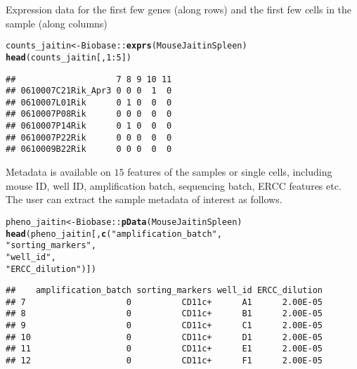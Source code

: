\documentclass[12pt]{article}\usepackage[]{graphicx}\usepackage[usenames,dvipsnames]{color}
\makeatletter
\newcommand{\hlnum}[1]{\textcolor[rgb]{0.686,0.059,0.569}{#1}}%
\newcommand{\hlstr}[1]{\textcolor[rgb]{0.192,0.494,0.8}{#1}}%
\newcommand{\hlopt}[1]{\textcolor[rgb]{0,0,0}{#1}}%
\newcommand{\hlstd}[1]{\textcolor[rgb]{0.345,0.345,0.345}{#1}}%
\newcommand{\hlkwb}[1]{\textcolor[rgb]{0.69,0.353,0.396}{#1}}%
\newcommand{\hlkwd}[1]{\textcolor[rgb]{0.737,0.353,0.396}{\textbf{#1}}}%
\newenvironment{kframe}{%
 \def\at@end@of@kframe{}%
 \ifinner\ifhmode%
  \def\at@end@of@kframe{\end{minipage}}%
  \begin{minipage}{\columnwidth}%
 \fi\fi%
 \def\FrameCommand##1{\hskip\@totalleftmargin \hskip-\fboxsep
 \colorbox{shadecolor}{##1}\hskip-\fboxsep
     \hskip-\linewidth \hskip-\@totalleftmargin \hskip\columnwidth}%
 \MakeFramed {\advance\hsize-\width
   \@totalleftmargin\z@ \linewidth\hsize
   \@setminipage}}%
 {\par\unskip\endMakeFramed%
 \at@end@of@kframe}
\newenvironment{knitrout}{}{} %
\makeatother
\begin{document}
Expression data for the first few genes (along rows) and the first few
cells in the sample (along columns)

\begin{knitrout}
\color{fgcolor}\begin{kframe}
\begin{alltt}
\hlstd{counts_jaitin} \hlkwb{<-} \hlstd{Biobase}\hlopt{::}\hlkwd{exprs}\hlstd{(MouseJaitinSpleen)}
\hlkwd{head}\hlstd{(counts_jaitin[,}\hlnum{1}\hlopt{:}\hlnum{5}\hlstd{])}
\end{alltt}
\begin{verbatim}
##                    7 8 9 10 11
## 0610007C21Rik_Apr3 0 0 0  1  0
## 0610007L01Rik      0 1 0  0  0
## 0610007P08Rik      0 0 0  0  0
## 0610007P14Rik      0 1 0  0  0
## 0610007P22Rik      0 0 0  0  0
## 0610009B22Rik      0 0 0  0  0
\end{verbatim}
\end{kframe}
\end{knitrout}


Metadata is available on $15$ features of the samples or single cells,
including mouse ID, well ID, amplification batch, sequencing batch,
ERCC features etc. The user can extract the sample metadata of interest as
follows.

\begin{knitrout}
\color{fgcolor}\begin{kframe}
\begin{alltt}
\hlstd{pheno_jaitin} \hlkwb{<-} \hlstd{Biobase}\hlopt{::}\hlkwd{pData}\hlstd{(MouseJaitinSpleen)}
\hlkwd{head}\hlstd{(pheno_jaitin[ ,}\hlkwd{c}\hlstd{(}\hlstr{"amplification_batch"}\hlstd{,}
                      \hlstr{"sorting_markers"}\hlstd{,}
                      \hlstr{"well_id"}\hlstd{,}
                      \hlstr{"ERCC_dilution"}\hlstd{)])}
\end{alltt}
\begin{verbatim}
##    amplification_batch sorting_markers well_id ERCC_dilution
## 7                    0          CD11c+      A1      2.00E-05
## 8                    0          CD11c+      B1      2.00E-05
## 9                    0          CD11c+      C1      2.00E-05
## 10                   0          CD11c+      D1      2.00E-05
## 11                   0          CD11c+      E1      2.00E-05
## 12                   0          CD11c+      F1      2.00E-05
\end{verbatim}
\end{kframe}
\end{knitrout}
\end{document}
